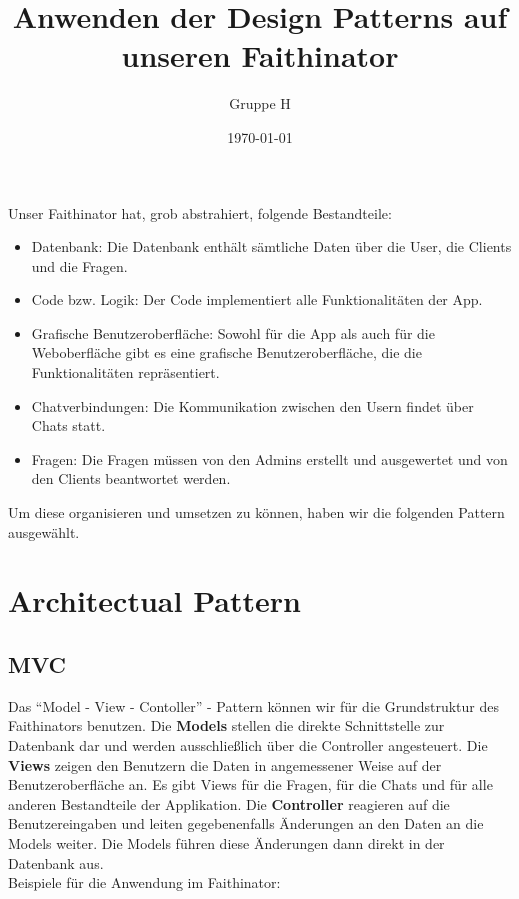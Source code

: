 \documentclass[a4paper,10pt]{article}
\title{Anwenden der Design Patterns auf unseren Faithinator}
\author{Gruppe H}
\date{\today}
\begin{document}
\maketitle
\newpage

\noindent
Unser Faithinator hat, grob abstrahiert, folgende Bestandteile: 
\begin{itemize}
 \item Datenbank: Die Datenbank enthält sämtliche Daten über die User, die Clients und die Fragen. 
 \item Code bzw. Logik: Der Code implementiert alle Funktionalitäten der App.
 \item Grafische Benutzeroberfläche: Sowohl für die App als auch für die Weboberfläche gibt es eine grafische Benutzeroberfläche, die die Funktionalitäten repräsentiert. 
 \item Chatverbindungen: Die Kommunikation zwischen den Usern findet über Chats statt. 
 \item Fragen: Die Fragen müssen von den Admins erstellt und ausgewertet und von den Clients beantwortet werden.
\end{itemize}
\noindent
Um diese organisieren und umsetzen zu können, haben wir die folgenden Pattern ausgewählt.


\section{Architectual Pattern}
\subsection{MVC}
Das ``Model - View - Contoller'' - Pattern können wir für die Grundstruktur des Faithinators benutzen. Die \textbf{Models} stellen die direkte Schnittstelle zur Datenbank dar und werden ausschließlich über die Controller angesteuert.
Die \textbf{Views} zeigen den Benutzern die Daten in angemessener Weise auf der Benutzeroberfläche an. Es gibt Views für die Fragen, für die Chats und für alle anderen Bestandteile der Applikation. 
Die \textbf{Controller} reagieren auf die Benutzereingaben und leiten gegebenenfalls Änderungen an den Daten an die Models weiter. Die Models führen diese Änderungen dann direkt in der Datenbank aus.
\\[1em]
Beispiele für die Anwendung im Faithinator:
\end{document}
